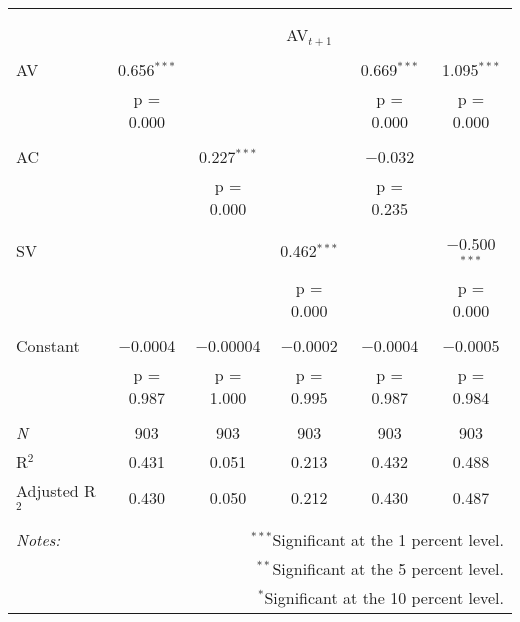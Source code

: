 
\begin{tabular}{@{\extracolsep{5pt}}lccccc} 
\\[-1.8ex]\hline 
\hline \\[-1.8ex] 
\\[-1.8ex] & \multicolumn{5}{c}{AV$_{t+1}$} \\ 
\hline \\[-1.8ex] 
 AV & 0.656$^{***}$ &  &  & 0.669$^{***}$ & 1.095$^{***}$ \\ 
  & p = 0.000 &  &  & p = 0.000 & p = 0.000 \\ 
  & & & & & \\ 
 AC &  & 0.227$^{***}$ &  & $-$0.032 &  \\ 
  &  & p = 0.000 &  & p = 0.235 &  \\ 
  & & & & & \\ 
 SV &  &  & 0.462$^{***}$ &  & $-$0.500$^{***}$ \\ 
  &  &  & p = 0.000 &  & p = 0.000 \\ 
  & & & & & \\ 
 Constant & $-$0.0004 & $-$0.00004 & $-$0.0002 & $-$0.0004 & $-$0.0005 \\ 
  & p = 0.987 & p = 1.000 & p = 0.995 & p = 0.987 & p = 0.984 \\ 
  & & & & & \\ 
\textit{N} & 903 & 903 & 903 & 903 & 903 \\ 
R$^{2}$ & 0.431 & 0.051 & 0.213 & 0.432 & 0.488 \\ 
Adjusted R$^{2}$ & 0.430 & 0.050 & 0.212 & 0.430 & 0.487 \\ 
\hline 
\hline \\[-1.8ex] 
\textit{Notes:} & \multicolumn{5}{r}{$^{***}$Significant at the 1 percent level.} \\ 
 & \multicolumn{5}{r}{$^{**}$Significant at the 5 percent level.} \\ 
 & \multicolumn{5}{r}{$^{*}$Significant at the 10 percent level.} \\ 
\end{tabular} 
